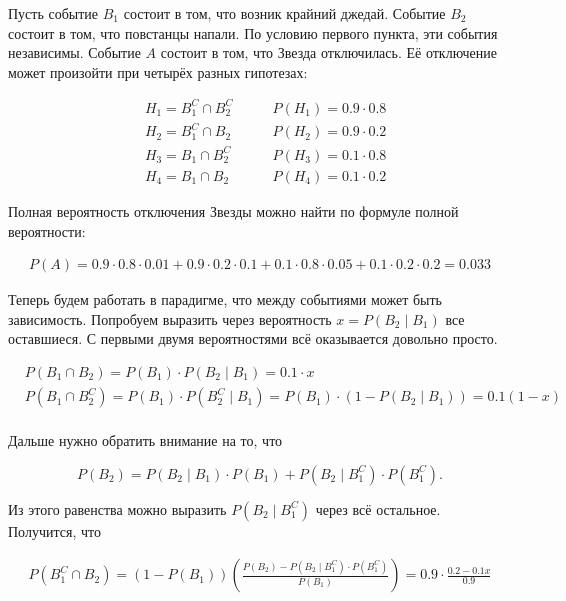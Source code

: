\documentclass[12pt, a4paper, oneside]{extreport}
\theoremstyle{plain}              %
\theoremstyle{definition}         %
\begin{document}
\begin{sol}
Пусть событие $B_1$ состоит в том, что возник крайний джедай. Событие $B_2$ состоит в том, что повстанцы напали. По условию первого пункта, эти события независимы. Событие $A$ состоит в том, что Звезда отключилась. Её отключение может произойти при четырёх разных гипотезах: 

\begin{equation*}
\begin{aligned}
&H_1 = B_1^{C} \cap B_2^{C} \qquad &P(H_1) = 0.9 \cdot 0.8 \\
&H_2 = B_1^{C}  \cap  B_2 \qquad &P(H_2) = 0.9 \cdot 0.2 \\
&H_3 = B_1 \cap B_2^{C}\qquad &P(H_3) = 0.1 \cdot 0.8 \\ 
&H_4 = B_1 \cap B_2 \qquad &P(H_4) = 0.1 \cdot 0.2 
\end{aligned}
\end{equation*}

Полная вероятность отключения Звезды можно найти по формуле полной вероятности: 

\begin{multline*}
P(A) = 0.9 \cdot 0.8 \cdot 0.01 + 0.9 \cdot 0.2 \cdot 0.1 + 0.1 \cdot 0.8 \cdot 0.05 + 0.1 \cdot 0.2 \cdot 0.2 = 0.033
\end{multline*}

Теперь будем работать в парадигме, что между событиями может быть зависимость. Попробуем выразить через вероятность $x = P(B_2 \mid B_1)$ все оставшиеся.  С первыми двумя вероятностями всё оказывается довольно просто.

\begin{equation*} 
\begin{aligned}
&P(B_1 \cap B_2) = P(B_1) \cdot P(B_2 \mid B_1) = 0.1 \cdot x \\
&P(B_1 \cap B_2^C) = P(B_1) \cdot P(B_2^{C} \mid B_1) = P(B_1) \cdot (1-P(B_2 \mid B_1)) = 0.1 (1-x) \\
\end{aligned}
\end{equation*}

Дальше нужно обратить внимание на то, что 

\[ P(B_2) = P(B_2 \mid B_1) \cdot P(B_1) + P(B_2 \mid B_1^C) \cdot P(B_1^C). \]

Из этого равенства можно выразить $P(B_2 \mid B_1^C) $  через всё остальное. Получится, что 
		
\begin{multline*}
P(B_1^C \cap B_2) = (1 - P(B_1))(\frac{P(B_2) - P(B_2 \mid B_1^C) \cdot P(B_1^C)}{P(B_1)} ) = 0.9 \cdot \frac{0.2 - 0.1 x}{0.9}
\end{multline*}


\end{sol}
\end{document}
